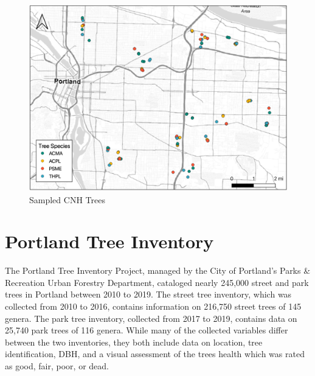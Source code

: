 \documentclass[12pt,twoside]{reedthesis}
\begin{document}
\begin{figure}

{\centering \includegraphics[width=1\linewidth]{figure/cnh_trees} 

}

\caption{Sampled CNH Trees}\label{fig:cnh-trees}
\end{figure}
\hypertarget{portland-tree-inventory}{%
\section{Portland Tree Inventory}\label{portland-tree-inventory}}

The Portland Tree Inventory Project, managed by the City of Portland's Parks \& Recreation Urban Forestry Department, cataloged nearly 245,000 street and park trees in Portland between 2010 to 2019. The street tree inventory, which was collected from 2010 to 2016, contains information on 216,750 street trees of 145 genera. The park tree inventory, collected from 2017 to 2019, contains data on 25,740 park trees of 116 genera. While many of the collected variables differ between the two inventories, they both include data on location, tree identification, DBH, and a visual assessment of the trees health which was rated as good, fair, poor, or dead.
\end{document}
